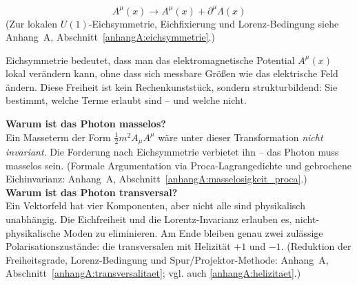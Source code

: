\[
A^\mu(x) \rightarrow A^\mu(x) + \partial^\mu \Lambda(x)
\]
(Zur lokalen \(U(1)\)-Eichsymmetrie, Eichfixierung und \newline Lorenz-Bedingung siehe Anhang~A, Abschnitt~\ref{anhangA:eichsymmetrie}.)
\vspace{1em}
\begin{tcolorbox}[physikbox, title=Was bedeutet Eichsymmetrie?]
	\label{box:was bedeutet Eichsy}
	\small
	Eichsymmetrie bedeutet, dass man das elektromagnetische Potential \( A^\mu(x) \) lokal verändern kann, ohne dass sich messbare Größen wie das elektrische Feld ändern. Diese Freiheit ist kein Rechenkunststück, sondern strukturbildend: Sie bestimmt, welche Terme erlaubt sind – und welche nicht.
\end{tcolorbox}
\vspace{2em}
\textbf{Warum ist das Photon masselos?}\\
Ein Masseterm der Form \( \frac{1}{2} m^2 A_\mu A^\mu \) wäre unter dieser Transformation \emph{nicht invariant}. Die Forderung nach Eichsymmetrie verbietet ihn – das Photon muss masselos sein.
(Formale Argumentation via Proca-Lagrange­dichte und gebrochene Eichinvarianz: Anhang~A, Abschnitt~\ref{anhangA:masselosigkeit_proca}.)\\

\textbf{Warum ist das Photon transversal?}\\
Ein Vektorfeld hat vier Komponenten, aber nicht alle sind physikalisch unabhängig. Die Eichfreiheit und die Lorentz-Invarianz erlauben es, nicht-physikalische Moden zu eliminieren. Am Ende bleiben genau zwei zulässige Polarisationszustände: die transversalen mit Helizität \( +1 \) und \( -1 \).
(Reduktion der Freiheitsgrade, Lorenz-Bedingung und Spur/Projektor-Methode: Anhang~A, Abschnitt~\ref{anhangA:transversalitaet}; vgl. auch \ref{anhangA:helizitaet}.)

